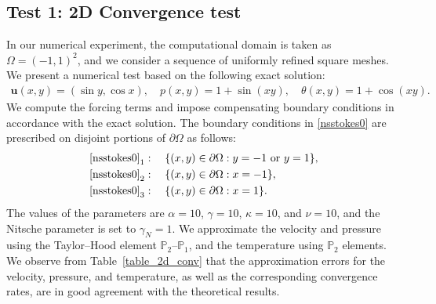 \documentclass[10pt,a4paper]{article}
\begin{document}
\subsection{Test 1: 2D Convergence test}
In our numerical experiment, the computational domain is taken as 
\(
\Omega = (-1,1)^2
\),
and we consider a sequence of uniformly refined square meshes.
We present a numerical test based on the following exact solution:
\begin{align*}
\boldsymbol{u}(x,y) = (\sin y,\cos x), \quad p(x,y) = 1 + \sin(xy), \quad
\theta(x,y) = 1 + \cos(xy).
\end{align*}
We compute the forcing terms and impose compensating boundary conditions in accordance with the exact solution. The boundary conditions in \eqref{nsstokes0} are prescribed on disjoint portions of $\partial \Omega$ as follows:
\begin{align*}
\eqref{nsstokes0}_1 &:\quad \{ (x,y) \in \partial \Omega : y = -1 \text{ or } y = 1 \}, \\
\eqref{nsstokes0}_2 &:\quad \{ (x,y) \in \partial \Omega : x = -1 \}, \\
\eqref{nsstokes0}_3 &:\quad \{ (x,y) \in \partial \Omega : x = 1 \}.
\end{align*}
The values of the parameters are $\alpha = 10$, $\gamma = 10$, $\kappa = 10$, and $\nu = 10$, and the Nitsche parameter is set to $\gamma_N = 1$.
We approximate the velocity and pressure using the Taylor--Hood element $\mathbb{P}_2$--$\mathbb{P}_1$, and the temperature using $\mathbb{P}_2$ elements. We observe from Table~\ref{table_2d_conv} that the approximation errors for the velocity, pressure, and temperature, as well as the corresponding convergence rates, are in good agreement with the theoretical results.
\end{document}
